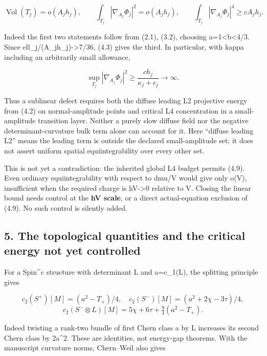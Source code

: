 \documentclass[
  10pt,
]{article}
\begin{document}
\[
 \operatorname{Vol}(T_j)=o(A_jh_j),\qquad
 \int_{T_j}|\nabla_{A_j}\Phi_j|^2=o(A_jh_j),\qquad
 \int_{T_j}|\nabla_{A_j}\Phi_j|^4\ge cA_jh_j.            \tag{4.9}
\]

Indeed the first two statements follow from (2.1), (3.2), choosing
a=1\textless b\textless4/3. Since ell\_j/(A\_jh\_j)-\textgreater7/36,
(4.3) gives the third. In particular, with kappa including an
arbitrarily small allowance,

\[
 \sup_{T_j}|\nabla_{A_j}\Phi_j|^2
       \ge\frac{c h_j}{\kappa_j+\epsilon_j}\longrightarrow\infty.
                                                        \tag{4.10}
\]

Thus a sublinear defect requires both the diffuse leading L2 projective
energy from (4.2) on normal-amplitude points and critical L4
concentration in a small-amplitude transition layer. Neither a purely
slow diffuse field nor the negative determinant-curvature bulk term
alone can account for it. Here ``diffuse leading L2'' means the leading
term is outside the declared small-amplitude set; it does not assert
uniform spatial equiintegrability over every other set.

This is not yet a contradiction: the inherited global L4 budget permits
(4.9). Even ordinary equiintegrability with respect to dmu/V would give
only o(V), insufficient when the required charge is hV-\textgreater0
relative to V. Closing the linear bound needs control at the \textbf{hV
scale}, or a direct actual-equation exclusion of (4.9). No such control
is silently added.

\hypertarget{the-topological-quantities-and-the-critical-energy-not-yet-controlled}{%
\subsection{5. The topological quantities and the critical energy not
yet
controlled}\label{the-topological-quantities-and-the-critical-energy-not-yet-controlled}}

For a Spin\^{}c structure with determinant L and a=c\_1(L), the
splitting principle gives

\[
 c_2(S^+)[M]=(a^2-T_+)/4,\quad
 c_2(S^-)[M]=(a^2+2\chi-3\tau)/4,
\] \[
 c_2(S^-\otimes L)[M]
   =5\chi+6\tau+\tfrac94(a^2-T_+).                    \tag{5.1}
\]

Indeed twisting a rank-two bundle of first Chern class a by L increases
its second Chern class by 2a\^{}2. These are identities, not energy-gap
theorems. With the manuscript curvature norms, Chern--Weil also gives
\end{document}
